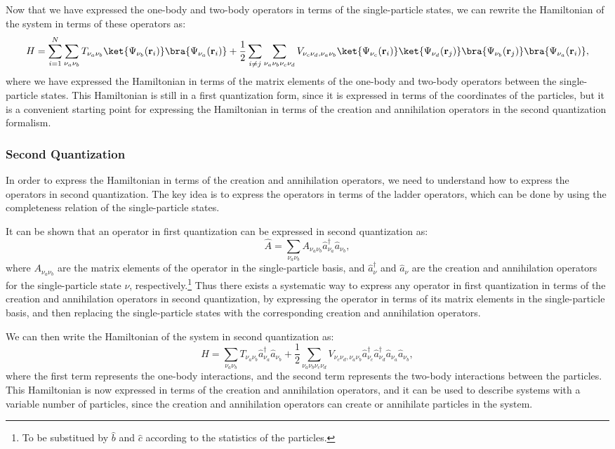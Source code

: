 Now that we have expressed the one-body and two-body operators in terms of the single-particle states, we can rewrite the Hamiltonian of the system in terms of these operators as:
\[
    H = \sum_{i=1}^N \sum_{\nu_a \nu_b} T_{\nu_a \nu_b} \ket{\Psi_{\nu_b}(\mathbf{r}_i)} \bra{\Psi_{\nu_a}(\mathbf{r}_i)} + \frac{1}{2} \sum_{i \neq j} \sum_{\nu_a \nu_b \nu_c \nu_d} V_{\nu_c \nu_d, \nu_a \nu_b} \ket{\Psi_{\nu_c}(\mathbf{r}_i)} \ket{\Psi_{\nu_d}(\mathbf{r}_j)} \bra{\Psi_{\nu_b}(\mathbf{r}_j)} \bra{\Psi_{\nu_a}(\mathbf{r}_i)},
\]
where we have expressed the Hamiltonian in terms of the matrix elements of the one-body and two-body operators between the single-particle states. This Hamiltonian is still in a first quantization form, since it is expressed in terms of the coordinates of the particles, but it is a convenient starting point for expressing the Hamiltonian in terms of the creation and annihilation operators in the second quantization formalism.

\subsubsection{Second Quantization}

In order to express the Hamiltonian in terms of the creation and annihilation operators, we need to understand how to express the operators in second quantization. The key idea is to express the operators in terms of the ladder operators, which can be done by using the completeness relation of the single-particle states.

It can be shown that an operator in first quantization can be expressed in second quantization as:
\[
    \hat{A} = \sum_{\nu_a \nu_b} A_{\nu_a \nu_b} \hat{a}_{\nu_a}^\dagger \hat{a}_{\nu_b},
\]
where \(A_{\nu_a \nu_b}\) are the matrix elements of the operator in the single-particle basis, and \(\hat{a}_{\nu}^\dagger\) and \(\hat{a}_{\nu}\) are the creation and annihilation operators for the single-particle state \(\nu\), respectively.\footnote{To be substitued by \(\hat{b}\) and \(\hat{c}\) according to the statistics of the particles.} Thus there exists a systematic way to express any operator in first quantization in terms of the creation and annihilation operators in second quantization, by expressing the operator in terms of its matrix elements in the single-particle basis, and then replacing the single-particle states with the corresponding creation and annihilation operators.

We can then write the Hamiltonian of the system in second quantization as:
\[
    H = \sum_{\nu_a \nu_b} T_{\nu_a \nu_b} \hat{a}_{\nu_a}^\dagger \hat{a}_{\nu_b} + \frac{1}{2} \sum_{\nu_a \nu_b \nu_c \nu_d} V_{\nu_c \nu_d, \nu_a \nu_b} \hat{a}_{\nu_c}^\dagger \hat{a}_{\nu_d}^\dagger \hat{a}_{\nu_a} \hat{a}_{\nu_b},
\]
where the first term represents the one-body interactions, and the second term represents the two-body interactions between the particles. This Hamiltonian is now expressed in terms of the creation and annihilation operators, and it can be used to describe systems with a variable number of particles, since the creation and annihilation operators can create or annihilate particles in the system.

